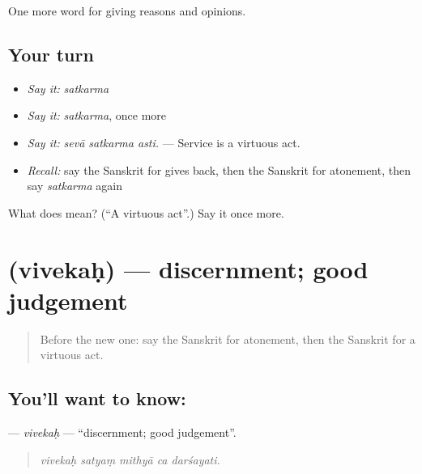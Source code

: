 \begin{grammarlens}[title={What you've built}]
One more word for giving reasons and opinions.
\end{grammarlens}

\subsection*{Your turn}
\begin{itemize}
\raggedright
  \item \emph{Say it:} \emph{satkarma}
  \item \emph{Say it:} \emph{satkarma}, once more
  \item \emph{Say it:} \emph{sevā satkarma asti.} — Service is a virtuous act.
  \item \emph{Recall:} say the Sanskrit for gives back, then the Sanskrit for atonement, then say \emph{satkarma} again
\end{itemize}

\begin{tcolorbox}[breakable,colback=teal!4,colframe=teal!35!black,title={Before you move on}]
What does  mean? (\textquotedblleft{}A virtuous act\textquotedblright{}.) Say it once more.
\end{tcolorbox}
\section[\texorpdfstring{\sk{विवेकः} (vivekaḥ)}{विवेकः (vivekaḥ)}]{ (vivekaḥ) — discernment; good judgement}

\label{lesson:SA-C351-vivekah}



\begin{quote}
Before the new one: say the Sanskrit for atonement, then the Sanskrit for a virtuous act.
\end{quote}

\subsection*{You'll want to know: }
\textbf{} — \emph{vivekaḥ} — \textquotedblleft{}discernment; good judgement\textquotedblright{}.

\begin{quote}
    
\end{quote}

\begin{quote}
\emph{vivekaḥ satyaṃ mithyā ca darśayati.}
\end{quote}

